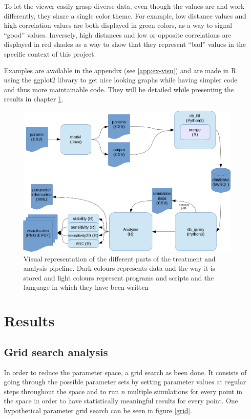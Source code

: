 \documentclass[a4paper,12pt]{report}
\begin{document}
To let the viewer easily grasp diverse data, even though the values are and work differently, they share a single color theme. For example, low distance values and high correlation values are both displayed in green colors, as a way to signal “good” values. Inversely, high distances and low or opposite correlations are displayed in red shades as a way to show that they represent “bad” values in the specific context of this project.

Examples are available in the appendix (see \ref{app:ex-visu}) and are made in R using the ggplot2 library \cite{Wic01} to get nice looking graphs while having simpler code and thus more maintainable code. They will be detailed while presenting the results in chapter \ref{chapter-results}.

\begin{figure}[!ht]
	\centering
	\includegraphics[width=1\textwidth]{../data/workflow-2.png}
	\caption{Visual representation of the different parts of the treatment and analysis pipeline. Dark colours represents data and the way it is stored and light colours represent programs and scripts and the language in which they have been written}
	\label{workflow-2}
\end{figure}

\chapter{Results}
\label{chapter-results}
\section{Grid search analysis}
In order to reduce the parameter space, a grid search as been done. It consists of going through the possible parameter sets by setting parameter values at regular steps throughout the space and to run $n$ multiple simulations for every point in the space in order to have statistically meaningful results for every point. One hypothetical parameter grid search can be seen in figure \ref{grid}.
\end{document}
